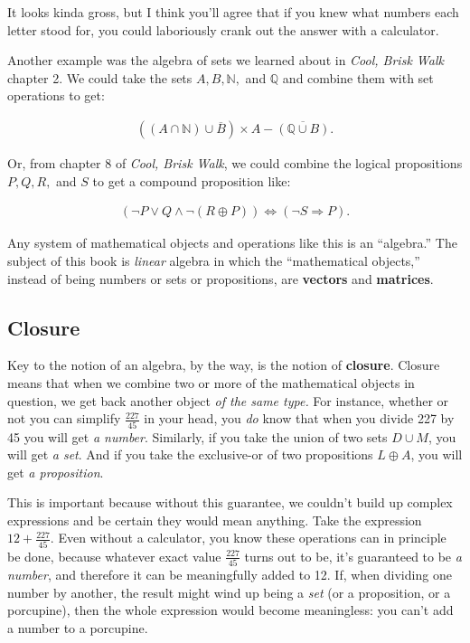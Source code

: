 It looks kinda gross, but I think you'll agree that if you knew what numbers
each letter stood for, you could laboriously crank out the answer with a
calculator.

Another example was the algebra of sets we learned about in \textit{Cool, Brisk
Walk} chapter 2. We could take the sets $A, B, \mathbb{N},$ and $\mathbb{Q}$
and combine them with set operations to get:

\vspace{-.25in}
\begin{align*}
((A \cap \mathbb{N}) \cup \overline{B}) \times A - \overline{(\mathbb{Q} \cup
B)}.
\end{align*}

Or, from chapter 8 of \textit{Cool, Brisk Walk}, we could combine the logical
propositions $P, Q, R,$ and $S$ to get a compound proposition like:

\vspace{-.25in}
\begin{align*}
(\neg P \vee Q \wedge \neg (R \oplus P)) \Leftrightarrow (\neg S \Rightarrow P).
\end{align*}

Any system of mathematical objects and operations like this is an ``algebra.''
The subject of this book is \textit{linear} algebra in which the ``mathematical
objects,'' instead of being numbers or sets or propositions, are
\textbf{vectors} and \textbf{matrices}.

\subsection{Closure}

Key to the notion of an algebra, by the way, is the notion of \textbf{closure}.
Closure means that when we combine two or more of the mathematical objects in
question, we get back another object \textit{of the same type.} For instance,
whether or not you can simplify $\frac{227}{45}$ in your head, you \textit{do}
know that when you divide 227 by 45 you will get \textit{a number}. Similarly,
if you take the union of two sets $D \cup M$, you will get \textit{a set}. And
if you take the exclusive-or of two propositions $L \oplus A$, you will get
\textit{a proposition}.


This is important because without this guarantee, we couldn't build up complex
expressions and be certain they would mean anything. Take the expression $12 +
\frac{227}{45}$. Even without a calculator, you know these operations can in
principle be done, because whatever exact value $\frac{227}{45}$ turns out to
be, it's guaranteed to be \textit{a number}, and therefore it can be
meaningfully added to 12. If, when dividing one number by another, the result
might wind up being a \textit{set} (or a proposition, or a porcupine), then the
whole expression would become meaningless: you can't add a number to a
porcupine.


